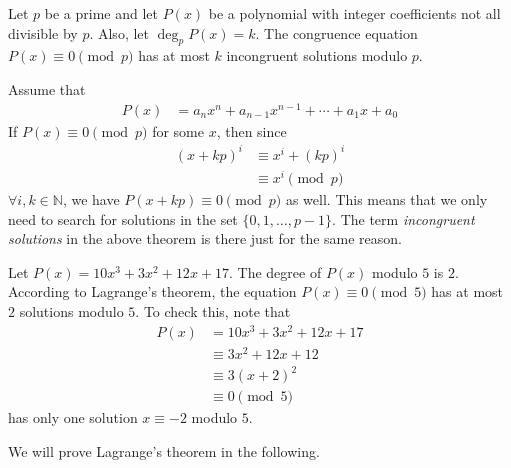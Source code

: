 \documentclass[12pt]{subfile}
\begin{document}
		\begin{theorem}\label{thm:lagrange}
			Let $p$ be a prime and let $P(x)$ be a polynomial with integer coefficients not all divisible by $p$. Also, let $\deg_p P(x) = k$. The congruence equation $P(x)\equiv0\pmod p$ has at most $k$ incongruent solutions modulo $p$.
		\end{theorem}

		\begin{note}
			Assume that
				\begin{align*}
					P(x)
						& =a_nx^n + a_{n-1}x^{n-1} + \cdots + a_1 x +a_0
				\end{align*}
			If $P(x) \equiv 0 \pmod p$ for some $x$, then since
				\begin{align*}
					(x+kp)^i
						& \equiv x^i + (kp)^i\\
						& \equiv x^i \pmod p
				\end{align*}
			$\forall i,k \in \mathbb N$, we have $P(x+kp) \equiv 0 \pmod p$ as well. This means that we only need to search for solutions in the set $\{0, 1, \ldots, p-1\}$. The term \textit{incongruent solutions} in the above theorem is there just for the same reason.
		\end{note}


		\begin{example}
			Let $P(x)=10x^3+3x^2 + 12x+17$.  The degree of $P(x)$ modulo $5$ is $2$. According to Lagrange's theorem, the equation $P(x) \equiv 0 \pmod 5$ has at most $2$ solutions modulo $5$. To check this, note that
				\begin{align*}
					P(x)
						& = 10x^3+3x^2 + 12x+17\\
						& \equiv 3x^2 + 12x+12\\
						& \equiv 3(x+2)^2\\
						& \equiv 0 \pmod 5
				\end{align*}
			has only one solution $x \equiv -2$ modulo $5$.
		\end{example}

	We will prove Lagrange's theorem in the following.
\end{document}
